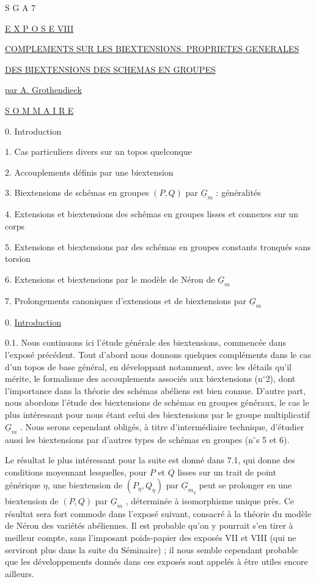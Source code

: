 


S G A 7


\underline{E X P O S E  VIII}


\underline{COMPLEMENTS SUR LES BIEXTENSIONS. PROPRIETES GENERALES}


\underline{DES BIEXTENSIONS DES SCHEMAS EN GROUPES}

\underline{par A. Grothendieck}


\underline{S O M M A I R E}

0. Introduction

1. Cas particuliers divers sur un topos quelconque

2. Accouplements définis par une biextension

3. Biextensions de schémas en groupes $(P,Q)$ par $\underline{G}_m$ : généralités

4. Extensions et biextensions des schémas en groupes lisses et connexes sur un corps

5. Extensions et biextensions par des schémas en groupes constants tronqués sans torsion

6. Extensions et biextensions par le modèle de Néron de $\underline{G}_m$

7. Prolongements canoniques d'extensions et de biextensions par $\underline{G}_m$


0. \underline{Introduction}

0.1.  Nous continuons ici l'étude générale des biextensions, commencée dans l'exposé précédent. Tout d'abord nous donnons quelques compléments dans le cas d'un topos de base général, en développant notamment, avec les détails qu'il mérite, le formalisme des accouplements associés aux biextensions (n$^{\circ}$2), dont l'importance dans la théorie des schémas abéliens est bien connue. D'autre part, nous abordons l'étude des biextensions de schémas en groupes généraux, le cas le plus intéressant pour nous étant celui des biextensions par le groupe multiplicatif $\underline{G}_m$ . Nous serons cependant obligés, à titre d'intermédiaire technique, d'étudier aussi les biextensions par d'autres types de schémas en groupes (n$^{\circ}$s 5 et 6).



Le résultat le plus intéressant pour la suite est donné dans 7.1, qui donne des conditions moyennant lesquelles, pour $P$ et $Q$ lisses sur un trait de point générique $\eta$, une biextension de $(P_\eta,Q_\eta)$ par $\underline{G}_{m_\eta}$ peut se prolonger en une biextension de $(P,Q)$ par $\underline{G}_m$ , déterminée à isomorphisme unique près. Ce résultat sera fort commode dans l'exposé suivant, consacré à la théorie du modèle de Néron des variétés abéliennes. Il est probable qu'on y pourrait s'en tirer à meilleur compte, sans l'imposant poids-papier des exposés VII et VIII (qui ne serviront plus dans la suite du Séminaire) ; il nous semble cependant probable que les développements donnés dans ces exposés sont appelés à être utiles encore ailleurs.

